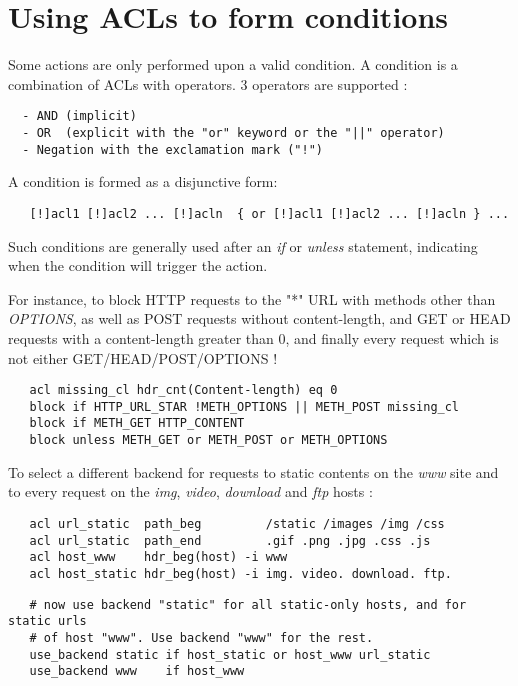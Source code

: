 
\section{Using ACLs to form conditions}

Some actions are only performed upon a valid condition. A condition is a
combination of ACLs with operators. 3 operators are supported :

\begin{verbatim}
  - AND (implicit)
  - OR  (explicit with the "or" keyword or the "||" operator)
  - Negation with the exclamation mark ("!")
\end{verbatim}


A condition is formed as a disjunctive form:

\begin{verbatim}
   [!]acl1 [!]acl2 ... [!]acln  { or [!]acl1 [!]acl2 ... [!]acln } ...
\end{verbatim}


Such conditions are generally used after an \emph{if} or \emph{unless} statement,
indicating when the condition will trigger the action.


For instance, to block HTTP requests to the "*" URL with methods other than
\emph{OPTIONS}, as well as POST requests without content-length, and GET or HEAD
requests with a content-length greater than 0, and finally every request which
is not either GET/HEAD/POST/OPTIONS !

\begin{verbatim}
   acl missing_cl hdr_cnt(Content-length) eq 0
   block if HTTP_URL_STAR !METH_OPTIONS || METH_POST missing_cl
   block if METH_GET HTTP_CONTENT
   block unless METH_GET or METH_POST or METH_OPTIONS
\end{verbatim}


To select a different backend for requests to static contents on the \emph{www} site
and to every request on the \emph{img}, \emph{video}, \emph{download} and \emph{ftp} hosts :

\begin{verbatim}
   acl url_static  path_beg         /static /images /img /css
   acl url_static  path_end         .gif .png .jpg .css .js
   acl host_www    hdr_beg(host) -i www
   acl host_static hdr_beg(host) -i img. video. download. ftp.
\end{verbatim}

\begin{verbatim}
   # now use backend "static" for all static-only hosts, and for static urls
   # of host "www". Use backend "www" for the rest.
   use_backend static if host_static or host_www url_static
   use_backend www    if host_www
\end{verbatim}


